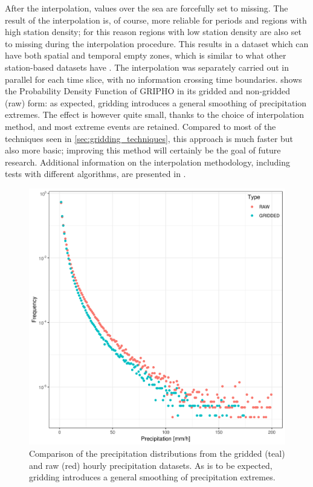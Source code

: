 After the interpolation, values over the sea are forcefully set to missing.
The result of the interpolation is, of course, more reliable for periods and regions with high station density; for this reason regions with low station density are also set to missing during the interpolation procedure.
This results in a dataset which can have both spatial and temporal empty zones, which is similar to what other station-based datasets have \citep[the E-OBS dataset from][for example, also has varying missing values]{Hofstra2008}.
The interpolation was separately carried out in parallel for each time slice, with no information crossing time boundaries.
 shows the Probability Density Function of GRIPHO in its gridded and non-gridded (raw) form: as expected, gridding introduces a general smoothing of precipitation extremes. The effect is however quite small, thanks to the choice of interpolation method, and most extreme events are retained.
Compared to most of the techniques seen in \cref{sec:gridding_techniques}, this approach is much faster but also more basic; improving this method will certainly be the goal of future research.
Additional information on the interpolation methodology, including tests with different algorithms, are presented in \citep[][in preparation]{Fantini2019a}.

\begin{figure}
    \centering
    \includegraphics[width=\textwidth]{figures/rain_dst/validation/compare.png}
    \decoRule
    \caption[PDFs for gridded and raw station data for the Italian hourly precipitation dataset GRIPHO]{Comparison of the precipitation distributions from the gridded (teal) and raw (red) hourly precipitation datasets. As is to be expected, gridding introduces a general smoothing of precipitation extremes.} \label{fig:gridVSnogrid_pdf}
\end{figure}


